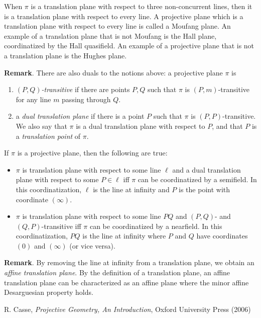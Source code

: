 \documentclass[12pt]{article}
\begin{document}
When $\pi$ is a translation plane with respect to three non-concurrent lines, then it is a translation plane with respect to every line.  A projective plane which is a translation plane with respect to every line is called a Moufang plane.  An example of a translation plane that is not Moufang is the Hall plane, coordinatized by the Hall quasifield.  An example of a projective plane that is not a translation plane is the Hughes plane.

\textbf{Remark}.  There are also duals to the notions above: a projective plane $\pi$ is
\begin{enumerate}
\item
\emph{$(P,Q)$-transitive} if there are points $P,Q$ such that $\pi$ is $(P,m)$-transitive for any line $m$ passing through $Q$.  
\item
a \emph{dual translation plane} if there is a point $P$ such that $\pi$ is $(P,P)$-transitive.  We also say that $\pi$ is a dual translation plane with respect to $P$, and that $P$ is a \emph{translation point} of $\pi$.
\end{enumerate}

If $\pi$ is a projective plane, then the following are true:
\begin{itemize}
\item
$\pi$ is translation plane with respect to some line $\ell$ and a dual translation plane with respect to some $P\in \ell$ iff $\pi$ can be coordinatized by a semifield.  In this coordinatization, $\ell$ is the line at infinity and $P$ is the point with coordinate $(\infty)$.
\item
$\pi$ is translation plane with respect to some line $PQ$ and $(P,Q)$- and $(Q,P)$-transitive iff $\pi$ can be coordinatized by a nearfield.  In this coordinatization, $PQ$ is the line at infinity where $P$ and $Q$ have coordinates $(0)$ and $(\infty)$ (or vice versa).
\end{itemize}

\textbf{Remark}.  By removing the line at infinity from a translation plane, we obtain an \emph{affine translation plane}.  By the definition of a translation plane, an affine translation plane can be characterized as an affine plane where the minor affine Desarguesian property holds.

\begin{thebibliography}{7}
 R. Casse, {\it Projective Geometry, An Introduction}, Oxford University Press (2006)
\end{thebibliography}
\end{document}
